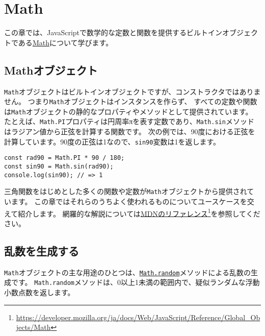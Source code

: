 \hypertarget{math}{%
\chapter{Math}\label{math}}
\thispagestyle{frontheadings}

この章では、JavaScriptで数学的な定数と関数を提供するビルトインオブジェクトである\href{https://developer.mozilla.org/ja/docs/Web/JavaScript/Reference/Global_Objects/Math}{Math}について学びます。

\hypertarget{math-object}{%
\section{Mathオブジェクト}\label{math-object}}

\texttt{Math}オブジェクトはビルトインオブジェクトですが、コンストラクタではありません。
つまり\texttt{Math}オブジェクトはインスタンスを作らず、
すべての定数や関数は\texttt{Math}オブジェクトの静的なプロパティやメソッドとして提供されています。
たとえば、\texttt{Math.PI}プロパティは円周率πを表す定数であり、\texttt{Math.sin}メソッドはラジアン値から正弦を計算する関数です。
次の例では、90度における正弦を計算しています。90度の正弦は1なので、\texttt{sin90}変数は1を返します。

\begin{lstlisting}
const rad90 = Math.PI * 90 / 180;
const sin90 = Math.sin(rad90);
console.log(sin90); // => 1
\end{lstlisting}

三角関数をはじめとした多くの関数や定数が\texttt{Math}オブジェクトから提供されています。
この章ではそれらのうちよく使われるものについてユースケースを交えて紹介します。
網羅的な解説については\href{https://developer.mozilla.org/ja/docs/Web/JavaScript/Reference/Global_Objects/Math}{MDNのリファレンス}\footnote{\url{https://developer.mozilla.org/ja/docs/Web/JavaScript/Reference/Global_Objects/Math}}を参照してください。

\hypertarget{create-random-number}{%
\section{乱数を生成する}\label{create-random-number}}

\texttt{Math}オブジェクトの主な用途のひとつは、\href{https://developer.mozilla.org/ja/docs/Web/JavaScript/Reference/Global_Objects/Math/random}{\texttt{Math.random}}メソッドによる乱数の生成です。
\texttt{Math.random}メソッドは、0以上1未満の範囲内で、疑似ランダムな浮動小数点数を返します。

